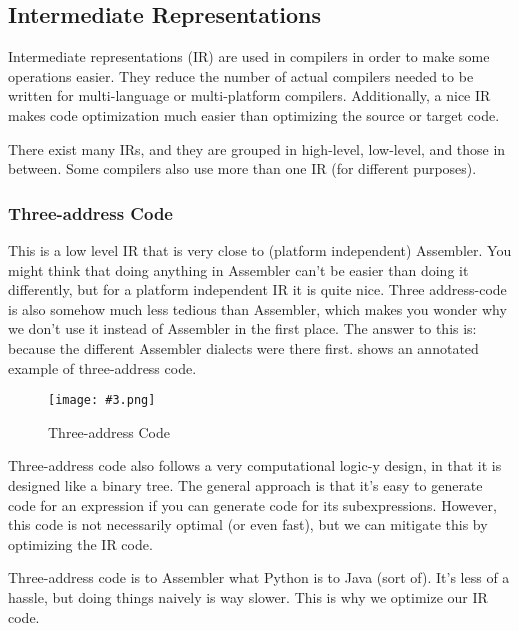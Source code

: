 \documentclass{article}
\newcommand{\fig}[4]{
	\begin{figure}[#1]
		\center
		\texttt{[image: \#3.png]}
		\caption{#4}
		\label{fig:#3}
	\end{figure}
	}
\begin{document}
\subsection{Intermediate Representations}
Intermediate representations (IR) are used in compilers in order to make some operations easier.
They reduce the number of actual compilers needed to be written for multi-language or multi-platform compilers.
Additionally, a nice IR makes code optimization much easier than optimizing the source or target code.

There exist many IRs, and they are grouped in high-level, low-level, and those in between.
Some compilers also use more than one IR (for different purposes).

\subsubsection{Three-address Code}
This is a low level IR that is very close to (platform independent) Assembler.
You might think that doing anything in Assembler can't be easier than doing it differently, but for a platform independent IR it is quite nice.
Three address-code is also somehow much less tedious than Assembler, which makes you wonder why we don't use it instead of Assembler in the first place.
The answer to this is: because the different Assembler dialects were there first.
 shows an annotated example of three-address code.

\fig{h}{}{tac}{Three-address Code}

Three-address code also follows a very computational logic-y design, in that it is designed like a binary tree.
The general approach is that it's easy to generate code for an expression if you can generate code for its subexpressions.
However, this code is not necessarily optimal (or even fast), but we can mitigate this by optimizing the IR code.

\begin{keypointbox}
	Three-address code is to Assembler what Python is to Java (sort of).
	It's less of a hassle, but doing things naively is way slower.
	This is why we optimize our IR code.
\end{keypointbox}
\end{document}
